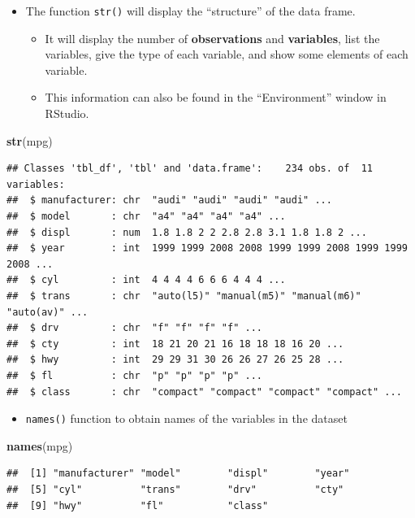 \documentclass[]{book}
\newenvironment{Shaded}{\begin{snugshade}}{\end{snugshade}}
\newcommand{\KeywordTok}[1]{\textcolor[rgb]{0.13,0.29,0.53}{\textbf{#1}}}
\newcommand{\NormalTok}[1]{#1}
\providecommand{\tightlist}{%
  \setlength{\itemsep}{0pt}\setlength{\parskip}{0pt}}
\begin{document}
\begin{itemize}
\tightlist
\item
  The function \texttt{str()} will display the ``structure'' of the data
  frame.

  \begin{itemize}
  \tightlist
  \item
    It will display the number of \textbf{observations} and
    \textbf{variables}, list the variables, give the type of each
    variable, and show some elements of each variable.
  \item
    This information can also be found in the ``Environment'' window in
    RStudio.
  \end{itemize}
\end{itemize}

\begin{Shaded}
\begin{Highlighting}[]
\KeywordTok{str}\NormalTok{(mpg)}
\end{Highlighting}
\end{Shaded}

\begin{verbatim}
## Classes 'tbl_df', 'tbl' and 'data.frame':    234 obs. of  11 variables:
##  $ manufacturer: chr  "audi" "audi" "audi" "audi" ...
##  $ model       : chr  "a4" "a4" "a4" "a4" ...
##  $ displ       : num  1.8 1.8 2 2 2.8 2.8 3.1 1.8 1.8 2 ...
##  $ year        : int  1999 1999 2008 2008 1999 1999 2008 1999 1999 2008 ...
##  $ cyl         : int  4 4 4 4 6 6 6 4 4 4 ...
##  $ trans       : chr  "auto(l5)" "manual(m5)" "manual(m6)" "auto(av)" ...
##  $ drv         : chr  "f" "f" "f" "f" ...
##  $ cty         : int  18 21 20 21 16 18 18 18 16 20 ...
##  $ hwy         : int  29 29 31 30 26 26 27 26 25 28 ...
##  $ fl          : chr  "p" "p" "p" "p" ...
##  $ class       : chr  "compact" "compact" "compact" "compact" ...
\end{verbatim}

\begin{itemize}
\tightlist
\item
  \texttt{names()} function to obtain names of the variables in the
  dataset
\end{itemize}

\begin{Shaded}
\begin{Highlighting}[]
\KeywordTok{names}\NormalTok{(mpg)}
\end{Highlighting}
\end{Shaded}

\begin{verbatim}
##  [1] "manufacturer" "model"        "displ"        "year"        
##  [5] "cyl"          "trans"        "drv"          "cty"         
##  [9] "hwy"          "fl"           "class"
\end{verbatim}
\end{document}
